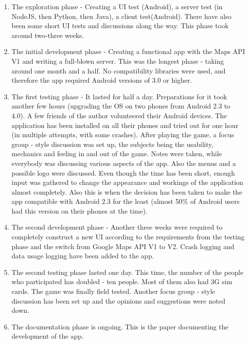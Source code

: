 \begin{enumerate}
  \item The exploration phase - Creating a UI test (Android), a server test
  (in NodeJS, then Python, then Java), a client test(Android). There have also
  been some short UI tests and discussions along the way. This phase took around
  two-three weeks.
  
  \item The initial development phase - Creating a functional app with the Maps
  API V1 and writing a full-blown server. This was the longest phase - taking
  around one month and a half. No compatibility libraries were used, and
  therefore the app required Android versions of 3.0 or higher.
  
  \item The first testing phase - It lasted for half a day. Preparations for it
  took another few hours (upgrading the OS on two phones from Android 2.3 to
  4.0). A few friends of the author volunteered their Android devices.
  The application has been installed on all their phones and tried out for one
  hour (in multiple attempts, with some crashes). After playing the game, a
  focus group - style discussion was set up, the subjects being the usability,
  mechanics and feeling in and out of the game. Notes were taken, while
  everybody was discussing various aspects of the app. Also the menus and a
  possible logo were discussed. Even though the time has been short, enough
  input was gathered to change the appearance and workings of the application
  almost completely. Also this is when the decision has been taken to make the
  app compatible with Android 2.3 for the least (almost 50\% of Android users
  had this version on their phones at the time).
  
  \item The second development phase - Another three weeks were required to
  completely construct a new UI according to the requirements from the testing
  phase and the switch from Google Maps API V1 to V2. Crash logging and data
  usage logging have been added to the app.
  
  \item The second testing phase lasted one day. This time, the number of the
  people who participated has doubled - ten people. Most of them also had 3G sim
  cards. The game was finally field tested. Another focus group - style
  discussion has been set up and the opinions and suggestions were noted down.
  
  \item The documentation phase is ongoing. This is the paper documenting the
  development of the app.
  
\end{enumerate}

